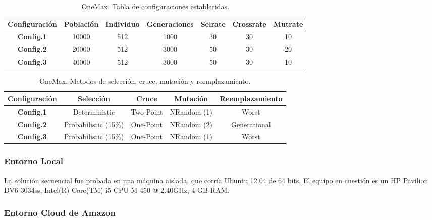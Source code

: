 \documentclass[runningheads]{llncs}
\begin{document}
\begin{table}[htb]

  \begin{tabular}{|| c | c | c | c |c | c | c ||}
    \hline
    \textbf{Configuración} & \textbf{Población} & \textbf{Individuo} & \textbf{Generaciones} &
    \textbf{Selrate} & \textbf{Crossrate} & \textbf{Mutrate}  \\

    \hline
    \textbf{Config.1} & 10000 & 512 & 1000 & 30 & 30 & 10 \\
    \hline
    \textbf{Config.2} & 20000 & 512 & 3000 & 50 & 30 & 20 \\
    \hline
    \textbf{Config.3} & 40000 & 512 & 3000 & 50 & 30 & 10 \\
    \hline
  \end{tabular}
  \caption{OneMax. Tabla de configuraciones establecidas.} 
  \label{TablaParametrosOneMax}
\end{table}

\begin{table}[htb]
  \begin{tabular}{|| c | c | c | c | c ||}
    \hline
    \textbf{Configuración} & \textbf{Selección} & \textbf{Cruce} & \textbf{Mutación} & \textbf{Reemplazamiento} \\
    \hline
    \textbf{Config.1} & Deterministic & Two-Point & NRandom (1) & Worst \\
    \hline
     \textbf{Config.2} & Probabilistic (15\%)  & One-Point & NRandom (2) & Generational \\
    \hline
    \textbf{Config.3} & Probabilistic (15\%) & One-Point & NRandom (1) & Worst  \\
    \hline
  \end{tabular}
  \caption{OneMax. Metodos de selección, cruce, mutación y reemplazamiento.} 
  \label{TablaMetodosOneMax}
\end{table}

\subsubsection{Entorno Local}

La solución secuencial fue probada en una máquina aislada, que corría Ubuntu 12.04 de 64 bits. El equipo en cuestión es un 
HP Pavilion DV6 3034ss, Intel(R) Core(TM) i5 CPU M 450 @ 2.40GHz, 4 GB RAM.

\subsubsection{Entorno Cloud de Amazon}
\end{document}

